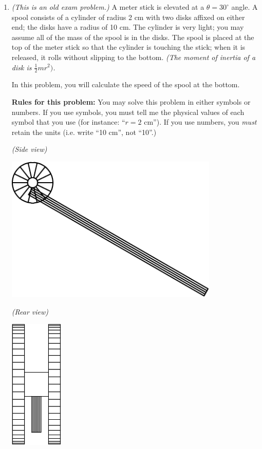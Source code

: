 \documentclass[12pt]{article}
\newcommand{\BC}{\begin{center}}
\newcommand{\EC}{\end{center}}
\begin{document}
\begin{enumerate}
	
	\bigskip
	\bigskip
	
	
	\newpage
	\item 
	\textit{(This is an old exam problem.)} A meter stick is elevated at a $\theta=30^\circ$ angle. A spool consists of a cylinder of radius 2 cm with two disks affixed on either end; the disks have a 
	radius of 10 cm. The cylinder is very light; you may assume all of the mass of the spool is in the disks. The spool is placed at the top of the meter stick
	so that the cylinder is touching the stick; when it is released, it rolls without slipping to the bottom. \it (The moment of inertia of a disk is $\frac{1}{2}mr^2)$. \rm
	
	In this problem, you will calculate the speed of the spool at the bottom. 
	
	\small
	
	{\bf Rules for this problem:} You may solve this problem in either symbols or numbers. 
	If you use symbols, you must tell me the physical values of each symbol that you use (for instance: ``$r=2$ cm''). If you use numbers, you {\it must} retain the
	units (i.e. write ``10 cm'', not ``10''.)
	
	\normalsize
	
	\begin{minipage}{0.5\textwidth}
		\BC
		\it (Side view)
		
		\includegraphics[width=0.8\textwidth]{sideview-crop.pdf}
		\EC
	\end{minipage}
	\begin{minipage}{0.5\textwidth}
		\BC
		\it (Rear view)
		
		\vspace{1cm}
		
		\includegraphics[width=0.2\textwidth]{rearview-crop.pdf}
		\EC
	\end{minipage}
	


\end{enumerate}
\end{document}
